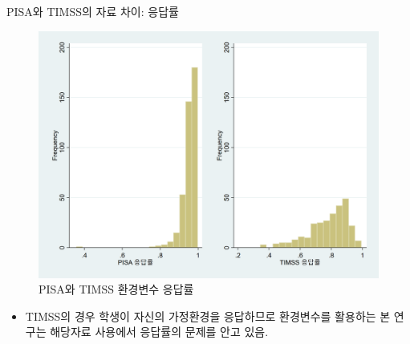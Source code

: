 \documentclass[handout, 10pt]{beamer}
\begin{document}
\begin{frame}{PISA와 TIMSS의 자료 차이: 응답률}
    \begin{figure}[htpb]
        \begin{center}
            \includegraphics[scale=0.08]{fig/pnt_response.png}
            \caption{PISA와 TIMSS 환경변수 응답률}
        \end{center}
    \end{figure}
    \begin{itemize}
        \item TIMSS의 경우 학생이 자신의 가정환경을 응답하므로 환경변수를 활용하는 본 연구는 해당자료 사용에서 응답률의 문제를 안고 있음.
    \end{itemize}
\end{frame}
\end{document}
